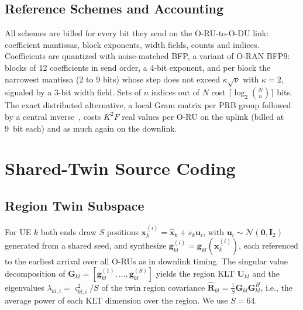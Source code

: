 \documentclass[journal]{IEEEtran}
\newcommand{\vect}[1]{\mathbf{#1}}
\begin{document}
\subsection{Reference Schemes and Accounting}
All schemes are billed for every bit they send on the O-RU-to-O-DU link: coefficient mantissas, block exponents, width fields, counts and indices. Coefficients are quantized with noise-matched BFP, a variant of O-RAN BFP9: blocks of 12 coefficients in send order, a 4-bit exponent, and per block the narrowest mantissa (2 to 9 bits) whose step does not exceed $\kappa\sqrt{\nu}$ with $\kappa=2$, signaled by a 3-bit width field. Sets of $n$ indices out of $N$ cost $\lceil\log_2\binom{N}{n}\rceil$ bits. The exact distributed alternative, a local Gram matrix per PRB group followed by a central inverse~\cite{li2017decentralized}, costs $K^2F$ real values per O-RU on the uplink (billed at 9~bit each) and as much again on the downlink.

\section{Shared-Twin Source Coding}\label{sec:method}

\subsection{Region Twin Subspace}
For UE $k$ both ends draw $S$ positions $\vect{x}_k^{(i)}=\hat{\vect{x}}_k+s_k\vect{u}_i$, with $\vect{u}_i\sim\mathcal{N}(\vect{0},\vect{I}_2)$ generated from a shared seed, and synthesize $\vect{g}^{(i)}_{kl}=\vect{g}_{kl}(\vect{x}^{(i)}_k)$, each referenced to the earliest arrival over all O-RUs as in downlink timing. The singular value decomposition of $\vect{G}_{kl}=[\vect{g}^{(1)}_{kl},\dots,\vect{g}^{(S)}_{kl}]$ yields the region KLT $\vect{U}_{kl}$ and the eigenvalues $\lambda_{kl,i}=\varsigma_{kl,i}^2/S$ of the twin region covariance $\hat{\vect{R}}_{kl}=\frac1S\vect{G}_{kl}\vect{G}_{kl}^{H}$, i.e., the average power of each KLT dimension over the region. We use $S=64$.
\end{document}
